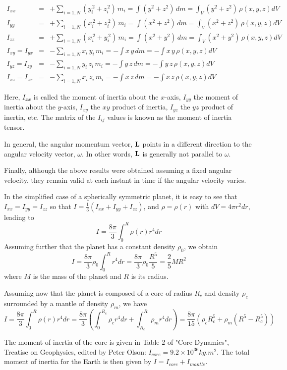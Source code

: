 \begin{eqnarray}
I_{xx}       &=& + \sum_{i=1,N}(y_i^{\,2}+z_i^{\,2}) \,m_i= \int(y^2+ z^2)\,dm = \int_V (y^2+ z^2)\,\rho(x,y,z) dV   \nonumber\\
I_{yy}       &=& + \sum_{i=1,N}(x_i^{\,2}+z_i^{\,2}) \,m_i= \int(x^2+ z^2)\,dm = \int_V (x^2+ z^2)\,\rho(x,y,z) dV   \nonumber\\
I_{zz}       &=& + \sum_{i=1,N}(x_i^{\,2}+y_i^{\,2}) \,m_i= \int(x^2+ y^2)\,dm = \int_V (x^2+ y^2)\,\rho(x,y,z) dV   \nonumber\\
I_{xy}=I_{yx}&=& - \sum_{i=1,N}x_i\,y_i \,m_i=- \int x\,y\,dm =- \int x\,y\,\rho(x,y,z) dV   \nonumber\\
I_{yz}=I_{zy}&=& - \sum_{i=1,N}y_i\,z_i \,m_i= -\int y\,z\,dm =- \int y\,z\,\rho(x,y,z) dV   \nonumber\\
I_{xz}=I_{zx}&=& - \sum_{i=1,N}x_i\,z_i \,m_i= -\int x\,z\,dm =- \int x\,z\,\rho(x,y,z) dV   \nonumber
\end{eqnarray}

Here, $I_{xx}$ is called the moment of inertia about the $x$-axis, $I_{yy}$ the moment of inertia about the $y$-axis, $I_{xy}$ the $xy$ product of inertia, $I_{yz}$ the $yz$ product of inertia, etc.
The matrix of the $I_{ij}$ values is known as the moment of inertia tensor.

 In general, the angular momentum vector, ${\bf L}$ points in a different direction to the angular velocity vector, $\omega$. In other words, ${\bf L}$ is generally not parallel to $\omega$.

Finally, although the above results were obtained assuming a fixed angular velocity, 
they remain valid at each instant in time if the angular velocity varies.

In the simplified case of a spherically symmetric planet, it is easy to see that $I_{xx}=I_{yy}=I_{zz}$ so that $I=\frac{1}{3}(I_{xx}+I_{yy}+I_{zz})$, and $\rho=\rho(r)$ with $dV=4\pi r^2 dr$, leading to
\[
I=\frac{8\pi}{3}\int_0^R \rho(r) r^4 dr
\]
Assuming further that the planet has a constant density $\rho_0$, we obtain 
\[
I=\frac{8 \pi}{3} \rho_0 \int_0^R  r^4 dr = \frac{8 \pi}{3} \rho_0 \frac{R^5}{5} = \frac{2}{5} M R^2 
\]
where $M$ is the mass of the planet and $R$ is its radius.

Assuming now that the planet is composed of a core of radius $R_c$ and density $\rho_c$ surrounded by a mantle of density $\rho_m$, 
we have
\[
I=\frac{8\pi}{3}\int_0^R \rho(r) r^4 dr
=\frac{8\pi}{3} \left( \int_0^{R_c} \rho_c r^4 dr +  \int_{R_c}^{R} \rho_m r^4 dr \right)
=\frac{8\pi}{15} \left( \rho_c R_c^5  +  \rho_m (R^5-R_c^5) \right)
\] 

The moment of inertia of the core is given in Table 2 of "Core Dynamics", Treatise on Geophysics, edited by Peter Olson:
$I_{core}=9.2\times10^{36} kg.m^2$. The total moment of inertia for the Earth is then given by $I=I_{core}+I_{mantle}$.


